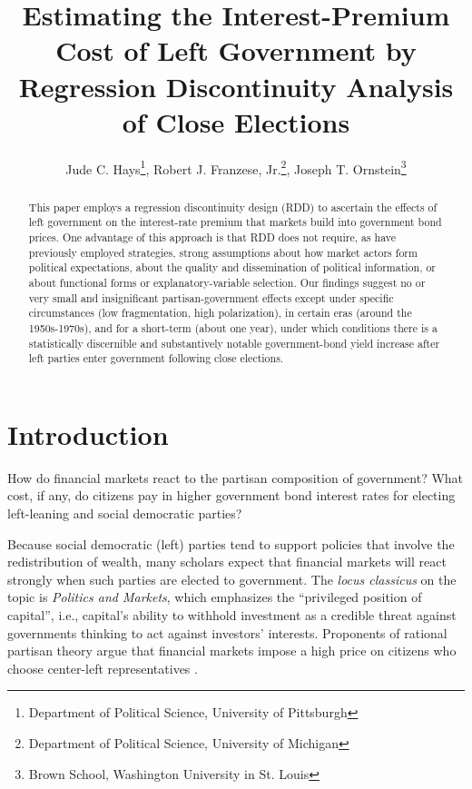 \documentclass[12pt]{article}
\author{Jude C. Hays\footnote{Department of Political Science, University of Pittsburgh}, Robert J. Franzese, Jr.\footnote{Department of Political Science, University of Michigan}, Joseph T. Ornstein\footnote{Brown School, Washington University in St. Louis}}
\title{Estimating the Interest-Premium Cost of Left Government by Regression Discontinuity Analysis of Close Elections}
\begin{document}
\singlespacing
\maketitle
\doublespacing

\begin{abstract} 
\noindent This paper employs a regression discontinuity design (RDD) to ascertain the effects of left government on the interest-rate premium that markets build into government bond prices. One advantage of this approach is that RDD does not require, as have previously employed strategies, strong assumptions about how market actors form political expectations, about the quality and dissemination of political information, or about functional forms or explanatory-variable selection. Our findings suggest no or very small and insignificant partisan-government effects except under specific circumstances (low fragmentation, high polarization), in certain eras (around the 1950s-1970s), and for a short-term (about one year), under which conditions there is a statistically discernible and substantively notable government-bond yield increase after left parties enter government following close elections.

\end{abstract}

\pagebreak

\section{Introduction}

How do financial markets react to the partisan composition of government? What cost, if any, do citizens pay in higher government bond interest rates for electing left-leaning and social democratic parties? 

Because social democratic (left) parties tend to support policies that involve the redistribution of wealth, many scholars expect that financial markets will react strongly when such parties are elected to government. The \textit{locus classicus} on the topic is \citet{Lindblom1977} \textit{Politics and Markets}, which emphasizes the ``privileged position of capital'', i.e., capital's ability to withhold investment as a credible threat against governments thinking to act against investors' interests. Proponents of rational partisan theory argue that financial markets impose a high price on citizens who choose center-left representatives \citep{Alesina1997, Herron2000}. 
\end{document}
